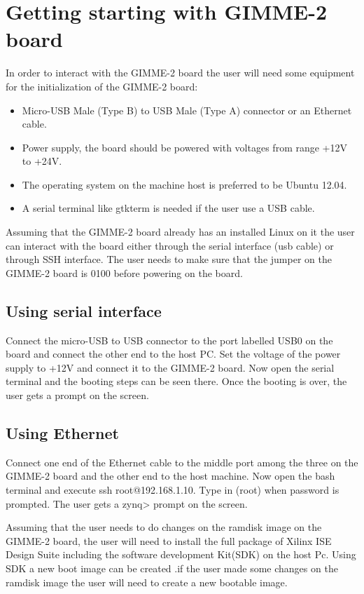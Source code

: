 \section{Getting starting with GIMME-2 board }
\label{GIMME2}
In order to interact with the GIMME-2 board the user will need some equipment for the initialization of the GIMME-2 board:

\begin{itemize}
\item Micro-USB Male (Type B) to USB Male (Type A) connector or an Ethernet cable.
\item Power supply, the board should be powered with voltages from range +12V to +24V.
\item The operating system on the machine host is preferred to be Ubuntu 12.04.
\item A serial terminal like gtkterm is needed if the user use a USB cable.
\end{itemize}

Assuming that the GIMME-2 board already has an installed Linux on it the user can interact with the board either through the serial interface (usb cable) or through SSH interface. The user needs to make sure that the jumper on the GIMME-2 board is 0100 before powering on the board.

\subsection{Using serial interface }
Connect the micro-USB to USB connector to the port labelled USB0 on the board and connect the other end to the host PC. Set the voltage of the power supply to +12V and connect it to the GIMME-2 board. Now open the serial terminal and the booting steps can be seen there. Once the booting is over, the user gets a  prompt on the screen.


\subsection{Using Ethernet }
Connect one end of the Ethernet cable to the middle port among the three on the GIMME-2 board and the other end to the host machine. Now open the bash terminal and execute ssh root@192.168.1.10. Type in (root) when password is prompted. The user gets a zynq> prompt on the screen.

Assuming that the user needs to do changes on the ramdisk image on the GIMME-2 board, the user will need to install the full package of Xilinx ISE Design Suite including the software development Kit(SDK) on the host Pc.
Using SDK a new boot image can be created .if the user made some changes on the ramdisk image the user will need to create a new bootable image. 

